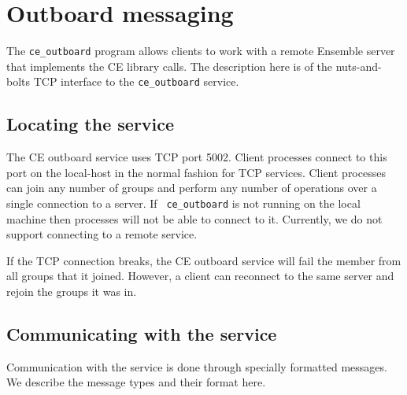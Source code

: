 \section{Outboard messaging}

The {\tt ce\_outboard} program allows clients to work with a remote Ensemble server
that implements the CE library calls. The description here is of the
nuts-and-bolts TCP interface to the {\tt ce\_outboard} service.


\subsection{Locating the service}
The CE outboard service uses TCP port 5002. Client
processes connect to this port on the local-host in the normal fashion for TCP
services. Client processes can join any number of groups and perform
any number of operations over a single connection to a server. If {\tt
  ce\_outboard} is not running on the local machine then processes
will not be able to connect to it. Currently, we do not support 
connecting to a remote service. 

If the TCP connection breaks, the CE outboard service will fail the
member from all groups that it joined.  However, a client can
reconnect to the same server and rejoin the groups it was in. 

\subsection{Communicating with the service}
Communication with the service is done through specially formatted
messages.  We describe the message types and their format here.


